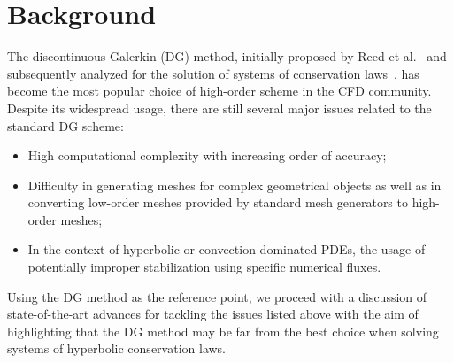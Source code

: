 \section{Background}
\label{sec:intro_background}

The discontinuous Galerkin (DG) method, initially proposed by Reed et
al.~\cite{Reed1973} and subsequently analyzed for the solution of systems of
conservation
laws~\cite{Cockburn1991,Cockburn1989a,Cockburn1989b,Cockburn1990,Cockburn1998},
has become the most popular choice of high-order scheme in the CFD community.
Despite its widespread usage, there are still several major issues related to
the standard DG scheme:
\begin{itemize}
\item High computational complexity with increasing order of accuracy;
\item Difficulty in generating meshes for complex geometrical objects as well as
  in converting low-order meshes provided by standard mesh generators to
  high-order meshes;
\item In the context of hyperbolic or convection-dominated PDEs, the usage of
  potentially improper stabilization using specific numerical fluxes.
\end{itemize}

Using the DG method as the reference point, we proceed with a discussion of
state-of-the-art advances for tackling the issues listed above with the aim
of highlighting that the DG method may be far from the best choice when
solving systems of hyperbolic conservation laws.




